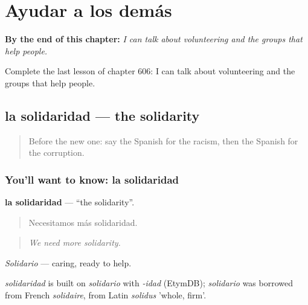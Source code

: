 
\chapter{Ayudar a los demás}
\label{ch:es-ayudar-a-los-demas}

\begin{chapteropening}
\textbf{By the end of this chapter:} \emph{I can talk about volunteering and the groups that help people.}

Complete the last lesson of chapter 606: I can talk about volunteering and the groups that help people.
\end{chapteropening}

\section[la solidaridad]{la solidaridad — the solidarity}

\label{lesson:ES-C606-solidaridad}



\begin{quote}
Before the new one: say the Spanish for the racism, then the Spanish for the corruption.
\end{quote}

\subsection*{You'll want to know: la solidaridad}
\textbf{la solidaridad} — \textquotedblleft{}the solidarity\textquotedblright{}.

\begin{quote}
Necesitamos más solidaridad.
\end{quote}

\begin{quote}
\emph{We need more solidarity.}
\end{quote}

\emph{Solidario} — caring, ready to help.

\begin{cousinweb}
\emph{solidaridad} is built on \emph{solidario} with \emph{-idad} (EtymDB); \emph{solidario} was borrowed from French \emph{solidaire}, from Latin \emph{solidus} 'whole, firm'.
\end{cousinweb}

